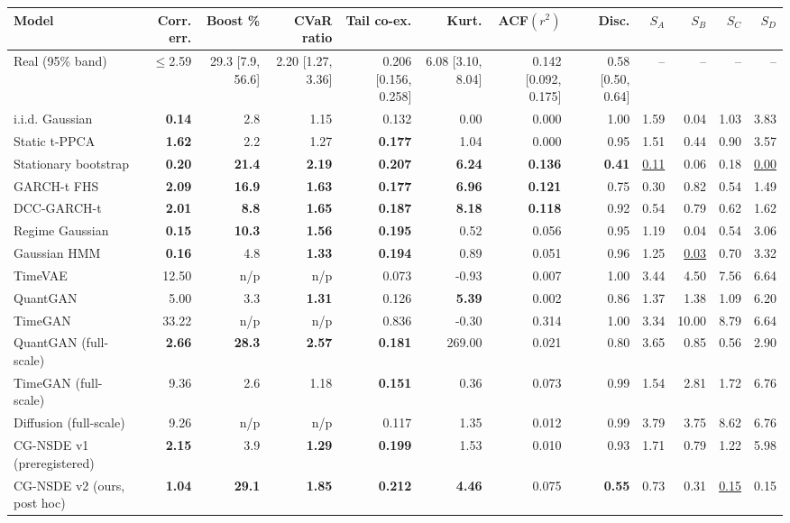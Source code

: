 \begin{tabular}{lrrrrrrrrrrr}
\toprule
Model & Corr. err. & Boost \% & CVaR ratio & Tail co-ex. & Kurt. & ACF$(r^2)$ & Disc. & $S_A$ & $S_B$ & $S_C$ & $S_D$ \\
\midrule
Real (95\% band) & $\le$2.59 & 29.3 [7.9, 56.6] & 2.20 [1.27, 3.36] & 0.206 [0.156, 0.258] & 6.08 [3.10, 8.04] & 0.142 [0.092, 0.175] & 0.58 [0.50, 0.64] & -- & -- & -- & -- \\
\midrule
i.i.d. Gaussian & \textbf{0.14} & 2.8 & 1.15 & 0.132 & 0.00 & 0.000 & 1.00 & 1.59 & 0.04 & 1.03 & 3.83 \\
Static t-PPCA & \textbf{1.62} & 2.2 & 1.27 & \textbf{0.177} & 1.04 & 0.000 & 0.95 & 1.51 & 0.44 & 0.90 & 3.57 \\
Stationary bootstrap & \textbf{0.20} & \textbf{21.4} & \textbf{2.19} & \textbf{0.207} & \textbf{6.24} & \textbf{0.136} & \textbf{0.41} & \underline{0.11} & 0.06 & 0.18 & \underline{0.00} \\
GARCH-t FHS & \textbf{2.09} & \textbf{16.9} & \textbf{1.63} & \textbf{0.177} & \textbf{6.96} & \textbf{0.121} & 0.75 & 0.30 & 0.82 & 0.54 & 1.49 \\
DCC-GARCH-t & \textbf{2.01} & \textbf{8.8} & \textbf{1.65} & \textbf{0.187} & \textbf{8.18} & \textbf{0.118} & 0.92 & 0.54 & 0.79 & 0.62 & 1.62 \\
Regime Gaussian & \textbf{0.15} & \textbf{10.3} & \textbf{1.56} & \textbf{0.195} & 0.52 & 0.056 & 0.95 & 1.19 & 0.04 & 0.54 & 3.06 \\
Gaussian HMM & \textbf{0.16} & 4.8 & \textbf{1.33} & \textbf{0.194} & 0.89 & 0.051 & 0.96 & 1.25 & \underline{0.03} & 0.70 & 3.32 \\
TimeVAE & 12.50 & n/p & n/p & 0.073 & -0.93 & 0.007 & 1.00 & 3.44 & 4.50 & 7.56 & 6.64 \\
QuantGAN & 5.00 & 3.3 & \textbf{1.31} & 0.126 & \textbf{5.39} & 0.002 & 0.86 & 1.37 & 1.38 & 1.09 & 6.20 \\
TimeGAN & 33.22 & n/p & n/p & 0.836 & -0.30 & 0.314 & 1.00 & 3.34 & 10.00 & 8.79 & 6.64 \\
QuantGAN (full-scale) & \textbf{2.66} & \textbf{28.3} & \textbf{2.57} & \textbf{0.181} & 269.00 & 0.021 & 0.80 & 3.65 & 0.85 & 0.56 & 2.90 \\
TimeGAN (full-scale) & 9.36 & 2.6 & 1.18 & \textbf{0.151} & 0.36 & 0.073 & 0.99 & 1.54 & 2.81 & 1.72 & 6.76 \\
Diffusion (full-scale) & 9.26 & n/p & n/p & 0.117 & 1.35 & 0.012 & 0.99 & 3.79 & 3.75 & 8.62 & 6.76 \\
CG-NSDE v1 (preregistered) & \textbf{2.15} & 3.9 & \textbf{1.29} & \textbf{0.199} & 1.53 & 0.010 & 0.93 & 1.71 & 0.79 & 1.22 & 5.98 \\
CG-NSDE v2 (ours, post hoc) & \textbf{1.04} & \textbf{29.1} & \textbf{1.85} & \textbf{0.212} & \textbf{4.46} & 0.075 & \textbf{0.55} & 0.73 & 0.31 & \underline{0.15} & 0.15 \\
\bottomrule
\end{tabular}
